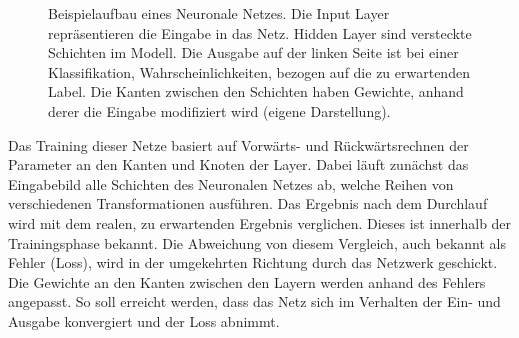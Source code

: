 \def\layersep{2.5cm}
\begin{figure}[!tb]\centering
{}
\caption[Beispielaufbau eines Neuronale Netzes]{Beispielaufbau eines Neuronale Netzes. Die Input Layer repräsentieren die Eingabe in das Netz. Hidden Layer sind versteckte Schichten im Modell. Die Ausgabe auf der linken Seite ist bei einer Klassifikation, Wahrscheinlichkeiten, bezogen auf die zu erwartenden Label. Die Kanten zwischen den Schichten haben Gewichte, anhand derer die Eingabe modifiziert wird (eigene Darstellung).}\label{cap:neuralnet}
\end{figure}\label{fig:neuralnet}

Das Training dieser Netze basiert auf Vorwärts- und Rückwärtsrechnen der Parameter an den Kanten und Knoten der Layer. Dabei läuft zunächst das Eingabebild alle Schichten des Neuronalen Netzes ab, welche Reihen von verschiedenen Transformationen ausführen. Das Ergebnis nach dem Durchlauf wird mit dem realen, zu erwartenden Ergebnis verglichen. Dieses ist innerhalb der Trainingsphase bekannt. Die Abweichung von diesem Vergleich, auch bekannt als Fehler (Loss), wird in der umgekehrten Richtung durch das Netzwerk geschickt. Die Gewichte an den Kanten zwischen den Layern werden anhand des Fehlers angepasst. So soll erreicht werden, dass das Netz sich im Verhalten der Ein- und Ausgabe konvergiert und der Loss abnimmt.


